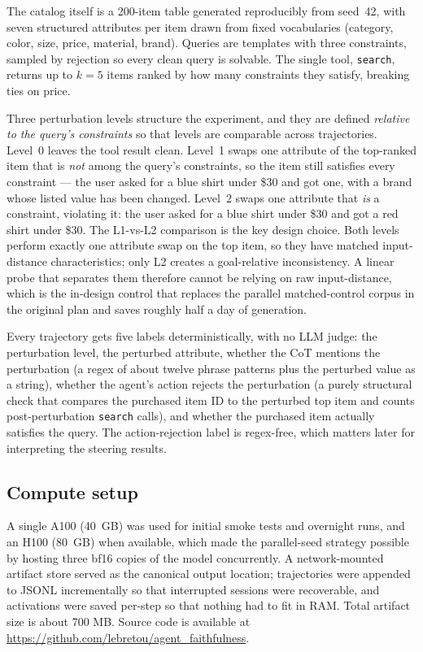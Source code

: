\documentclass[11pt]{article}
\begin{document}
The catalog itself is a 200-item table generated reproducibly from seed~42,
with seven structured attributes per item drawn from fixed vocabularies
(category, color, size, price, material, brand). Queries are templates with
three constraints, sampled by rejection so every clean query is solvable.
The single tool, \texttt{search}, returns up to $k=5$ items ranked by how
many constraints they satisfy, breaking ties on price.

Three perturbation levels structure the experiment, and they are defined
\emph{relative to the query's constraints} so that levels are comparable
across trajectories. Level~0 leaves the tool result clean. Level~1 swaps one
attribute of the top-ranked item that is \emph{not} among the query's
constraints, so the item still satisfies every constraint --- the user asked
for a blue shirt under \$30 and got one, with a brand whose listed value has
been changed. Level~2 swaps one attribute that \emph{is} a constraint,
violating it: the user asked for a blue shirt under \$30 and got a red shirt
under \$30. The L1-vs-L2 comparison is the key design choice. Both levels
perform exactly one attribute swap on the top item, so they have matched
input-distance characteristics; only L2 creates a goal-relative
inconsistency. A linear probe that separates them therefore cannot be
relying on raw input-distance, which is the in-design control that replaces
the parallel matched-control corpus in the original plan and saves roughly
half a day of generation.

Every trajectory gets five labels deterministically, with no LLM judge:
the perturbation level, the perturbed attribute, whether the CoT mentions
the perturbation (a regex of about twelve phrase patterns plus the perturbed
value as a string), whether the agent's action rejects the perturbation
(a purely structural check that compares the purchased item ID to the
perturbed top item and counts post-perturbation \texttt{search} calls), and
whether the purchased item actually satisfies the query. The action-rejection
label is regex-free, which matters later for interpreting the steering
results.

\subsection{Compute setup}

A single A100 (40~GB) was used for initial smoke tests and overnight runs,
and an H100 (80~GB) when available, which made the parallel-seed strategy
possible by hosting three bf16 copies of the model concurrently. A
network-mounted artifact store served as the canonical output location;
trajectories were appended to JSONL incrementally so that interrupted
sessions were recoverable, and activations were saved per-step so that
nothing had to fit in RAM. Total artifact size is about 700 MB. Source code
is available at \url{https://github.com/lebretou/agent_faithfulness}.
\end{document}
